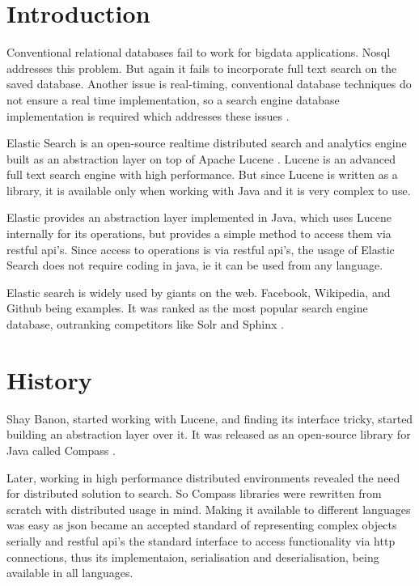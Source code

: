 \documentclass[12pt]{article}
\begin{document}
	\tableofcontents
	\listoffigures
	\newpage
	\printacronyms[include-classes=abbrev,name=Abbreviations]
	\newpage


	\renewcommand{\abstractname}{\Large Abstract}
	
	\newpage

	\section{Introduction}
		Conventional relational databases fail to work for bigdata applications. No\ac{sql} addresses this problem. But again it fails to incorporate full text search on the saved database. Another issue is real-timing, conventional database techniques do not ensure a real time implementation, so a search engine database implementation is required which addresses these issues \cite{mine}.

		Elastic Search is an open-source realtime distributed search and analytics engine built as an abstraction layer on top of Apache Lucene \cite{book}. Lucene is an advanced full text search engine with high performance\cite{lucenesite}. But since Lucene is written as a library, it is available only when working with Java and it is very complex to use.

		Elastic provides an abstraction layer implemented in Java, which uses Lucene internally for its operations, but provides a simple method to access them via \ac{rest}ful \ac{api}'s. Since access to operations is via \ac{rest}ful \ac{api}'s, the usage of Elastic Search does not require coding in java, ie it can be used from any language.

		Elastic search is widely used by giants on the web. Facebook, Wikipedia, and Github being examples. It was ranked as the most popular search engine database, outranking competitors like Solr and Sphinx \cite{dbranking}.

	\section{History}
		Shay Banon, started working with Lucene, and finding its interface tricky, started building an abstraction layer over it. It was released as an open-source library for Java called Compass \cite{site}.

		Later, working in high performance distributed environments revealed the need for distributed solution to search. So Compass libraries were rewritten from scratch with distributed usage in mind. Making it available to different languages was easy as \ac{json} became an accepted standard of representing complex objects serially and \ac{rest}ful \ac{api}'s the standard interface to access functionality via \ac{http} connections, thus its implementaion, serialisation and deserialisation, being available in all languages.
	
\end{document}
